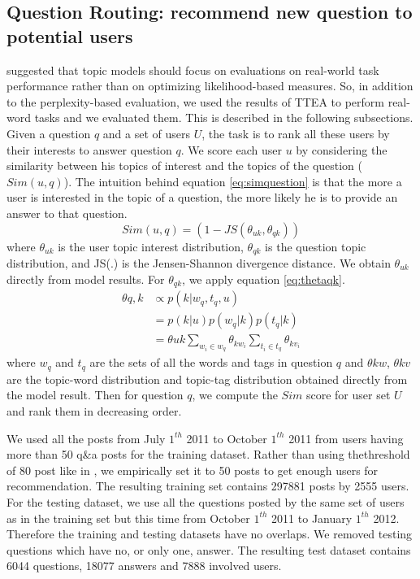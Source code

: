 {{{{{{{\subsection{Question Routing: recommend new question to potential users}
\label{sec:qrouting}
\cite{Chang09} suggested that topic models should focus on evaluations on real-world task performance rather than on optimizing likelihood-based measures. So, in addition to the perplexity-based evaluation, we used the results of TTEA to perform real-word tasks and we evaluated them. This is described in the following subsections.
Given a question $q$ and a set of users $U$, the task is to rank all these users by their interests to answer question $q$.
We score each user $u$ by considering the similarity between his topics of interest and the topics of the question ($Sim(u,q)$). The intuition behind equation \ref{eq:simquestion} is that the more a user is interested in the topic of a question, the more likely he is to provide an answer to that question.
\begin{equation}
Sim(u,q) = (1 -JS(\theta_{uk},\theta_{qk}))
\label{eq:simquestion}
\end{equation}
where $\theta_{uk}$ is the user topic interest distribution, $\theta_{qk}$ is the question topic distribution, and JS(.) is the Jensen-Shannon divergence distance. We obtain $\theta_{uk}$ directly from model results. For $\theta_{qk}$, we apply equation \ref{eq:thetaqk}.
\begin{equation}
\begin{split}
\theta{q,k} &\propto p(k|w_q,t_q,u) \\
           &=p(k|u)p(w_q|k)p(t_q|k) \\
           &= \theta{uk} \sum_{w_i \in w_q} \theta_{kw_i} \sum_{t_i \in t_q} \theta_{kv_i} 
\end{split}
\label{eq:thetaqk}
\end{equation}
where $w_q$ and $t_q$ are the sets of all the words and tags in question $q$ and $\theta{kw}$, $\theta{kv}$ are the topic-word distribution and topic-tag distribution obtained directly from the model result. Then for question $q$, we compute the $Sim$ score for user set $U$ and rank them in decreasing order. %


We used all the posts from July $1^{th}$ 2011 to October $1^{th}$ 2011 from users having more than 50 q\&a posts for the training dataset. Rather than using thethreshold of 80 post like in \cite{yang2013cqarank}, we empirically set it to 50 posts to get enough users for recommendation. 
The resulting training set contains 297881 posts by 2555 users. For the testing dataset, we use all the questions posted by the same set of users as in the training set but this time from October $1^{th}$ 2011 to January $1^{th}$ 2012. Therefore the training and testing datasets have no overlaps. We removed testing questions which have no, or only one, answer. The resulting test dataset contains 6044 questions, 18077 answers and 7888 involved users. 

}}}}}}}
